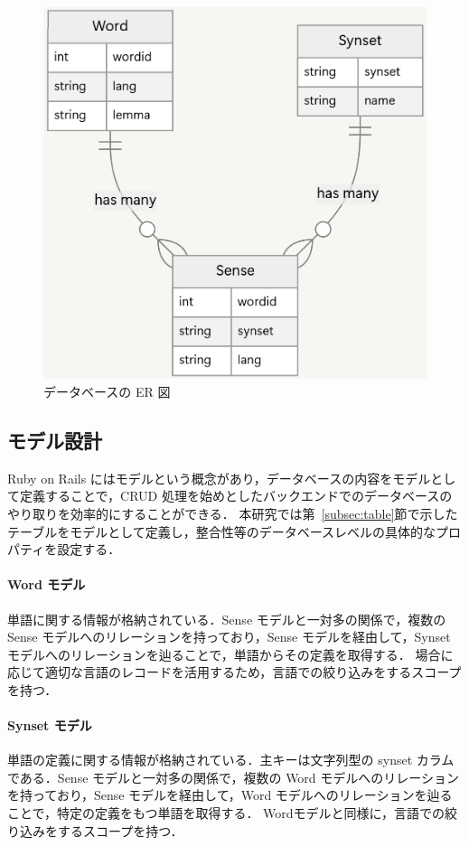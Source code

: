 \begin{figure}[h]
    \label{fig:er_diagram}
    \centering
    \includegraphics[scale = 0.4]{img/er_diagram.png}
    \caption{データベースの ER 図}
  \end{figure}

\subsection{モデル設計}
\label{subsec:model}

Ruby on Rails にはモデルという概念があり，データベースの内容をモデルとして定義することで，CRUD 処理を始めとしたバックエンドでのデータベースのやり取りを効率的にすることができる．
本研究では第~\ref{subsec:table}節で示したテーブルをモデルとして定義し，整合性等のデータベースレベルの具体的なプロパティを設定する．

\paragraph{Word モデル}
単語に関する情報が格納されている．Sense モデルと一対多の関係で，複数のSense モデルへのリレーションを持っており，Sense モデルを経由して，Synset モデルへのリレーションを辿ることで，単語からその定義を取得する．
場合に応じて適切な言語のレコードを活用するため，言語での絞り込みをするスコープを持つ．

\paragraph{Synset モデル}
単語の定義に関する情報が格納されている．主キーは文字列型の synset カラムである．Sense モデルと一対多の関係で，複数の Word モデルへのリレーションを持っており，Sense モデルを経由して，Word モデルへのリレーションを辿ることで，特定の定義をもつ単語を取得する．
Wordモデルと同様に，言語での絞り込みをするスコープを持つ．

